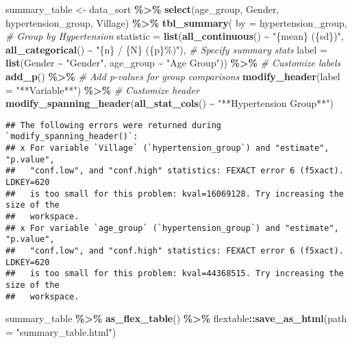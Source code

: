\documentclass[
]{article}
\newenvironment{Shaded}{\begin{snugshade}}{\end{snugshade}}
\newcommand{\AttributeTok}[1]{\textcolor[rgb]{0.13,0.29,0.53}{#1}}
\newcommand{\CommentTok}[1]{\textcolor[rgb]{0.56,0.35,0.01}{\textit{#1}}}
\newcommand{\FunctionTok}[1]{\textcolor[rgb]{0.13,0.29,0.53}{\textbf{#1}}}
\newcommand{\NormalTok}[1]{#1}
\newcommand{\OtherTok}[1]{\textcolor[rgb]{0.56,0.35,0.01}{#1}}
\newcommand{\SpecialCharTok}[1]{\textcolor[rgb]{0.81,0.36,0.00}{\textbf{#1}}}
\newcommand{\StringTok}[1]{\textcolor[rgb]{0.31,0.60,0.02}{#1}}
\begin{document}
\begin{Shaded}
\begin{Highlighting}[]
\NormalTok{summary\_table }\OtherTok{\textless{}{-}}\NormalTok{ data\_sort }\SpecialCharTok{\%\textgreater{}\%} \FunctionTok{select}\NormalTok{(age\_group, Gender, hypertension\_group, Village) }\SpecialCharTok{\%\textgreater{}\%}
  \FunctionTok{tbl\_summary}\NormalTok{(}
    \AttributeTok{by =}\NormalTok{ hypertension\_group,  }\CommentTok{\# Group by Hypertension}
    \AttributeTok{statistic =} \FunctionTok{list}\NormalTok{(}\FunctionTok{all\_continuous}\NormalTok{() }\SpecialCharTok{\textasciitilde{}} \StringTok{"\{mean\} (\{sd\})"}\NormalTok{, }\FunctionTok{all\_categorical}\NormalTok{() }\SpecialCharTok{\textasciitilde{}} \StringTok{"\{n\} / \{N\} (\{p\}\%)"}\NormalTok{),  }\CommentTok{\# Specify summary stats}
    \AttributeTok{label =} \FunctionTok{list}\NormalTok{(Gender }\SpecialCharTok{\textasciitilde{}} \StringTok{"Gender"}\NormalTok{,}
\NormalTok{                 age\_group }\SpecialCharTok{\textasciitilde{}} \StringTok{"Age Group"}\NormalTok{)) }\SpecialCharTok{\%\textgreater{}\%}  \CommentTok{\# Customize labels}
  \FunctionTok{add\_p}\NormalTok{() }\SpecialCharTok{\%\textgreater{}\%}  \CommentTok{\# Add p{-}values for group comparisons}
  \FunctionTok{modify\_header}\NormalTok{(}\AttributeTok{label =} \StringTok{"**Variable**"}\NormalTok{) }\SpecialCharTok{\%\textgreater{}\%}  \CommentTok{\# Customize header}
  \FunctionTok{modify\_spanning\_header}\NormalTok{(}\FunctionTok{all\_stat\_cols}\NormalTok{() }\SpecialCharTok{\textasciitilde{}} \StringTok{"**Hypertension Group**"}\NormalTok{)}
\end{Highlighting}
\end{Shaded}

\begin{verbatim}
## The following errors were returned during `modify_spanning_header()`:
## x For variable `Village` (`hypertension_group`) and "estimate", "p.value",
##   "conf.low", and "conf.high" statistics: FEXACT error 6 (f5xact).  LDKEY=620
##   is too small for this problem: kval=16069128. Try increasing the size of the
##   workspace.
## x For variable `age_group` (`hypertension_group`) and "estimate", "p.value",
##   "conf.low", and "conf.high" statistics: FEXACT error 6 (f5xact).  LDKEY=620
##   is too small for this problem: kval=44368515. Try increasing the size of the
##   workspace.
\end{verbatim}

\begin{Shaded}
\begin{Highlighting}[]
\NormalTok{summary\_table }\SpecialCharTok{\%\textgreater{}\%}
  \FunctionTok{as\_flex\_table}\NormalTok{() }\SpecialCharTok{\%\textgreater{}\%}
\NormalTok{  flextable}\SpecialCharTok{::}\FunctionTok{save\_as\_html}\NormalTok{(}\AttributeTok{path =} \StringTok{"summary\_table.html"}\NormalTok{)}
\end{Highlighting}
\end{Shaded}
\end{document}
